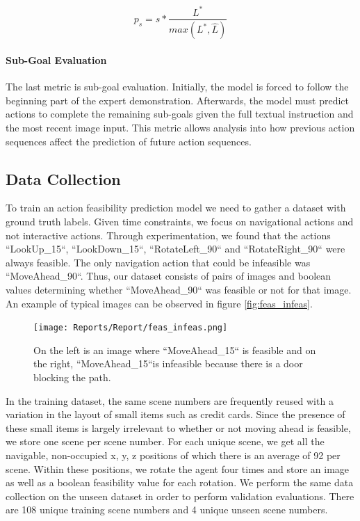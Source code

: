 \documentclass[11pt,a4paper]{article}
\begin{document}
$$p_s = s * \frac{L^{*}}{max(L^{*}, \hat{L} )}$$

\paragraph{Sub-Goal Evaluation} The last metric is sub-goal evaluation. Initially, the model is forced to follow the beginning part of the expert demonstration. Afterwards, the model must predict actions to complete the remaining sub-goals given the full textual instruction and the most recent image input. This metric allows analysis into how previous action sequences affect the prediction of future action sequences.

\subsection{Data Collection}

To train an action feasibility prediction model we need to gather a dataset with ground truth labels. Given time constraints, we focus on navigational actions and not interactive actions. Through experimentation, we found that the actions ``LookUp\_15``, ``LookDown\_15``, ``RotateLeft\_90`` and ``RotateRight\_90`` were always feasible. The only navigation action that could be infeasible was ``MoveAhead\_90``. Thus, our dataset consists of pairs of images and boolean values determining whether ``MoveAhead\_90`` was feasible or not for that image. An example of typical images can be observed in figure \autoref{fig:feas_infeas}.

\begin{figure}
    \centering
    \texttt{[image: Reports/Report/feas\_infeas.png]}
    \caption{On the left is an image where ``MoveAhead\_15`` is feasible and on the right, ``MoveAhead\_15``is infeasible because there is a door blocking the path.}
    \label{fig:feas_infeas}
\end{figure}

In the training dataset, the same scene numbers are frequently reused with a variation in the layout of small items such as credit cards. Since the presence of these small items is largely irrelevant to whether or not moving ahead is feasible, we store one scene per scene number. For each unique scene, we get all the navigable, non-occupied x, y, z positions of which there is an average of 92 per scene. Within these positions, we rotate the agent four times and store an image as well as a boolean feasibility value for each rotation. We perform the same data collection on the unseen dataset in order to perform validation evaluations. There are 108 unique training scene numbers and 4 unique unseen scene numbers.
\end{document}
